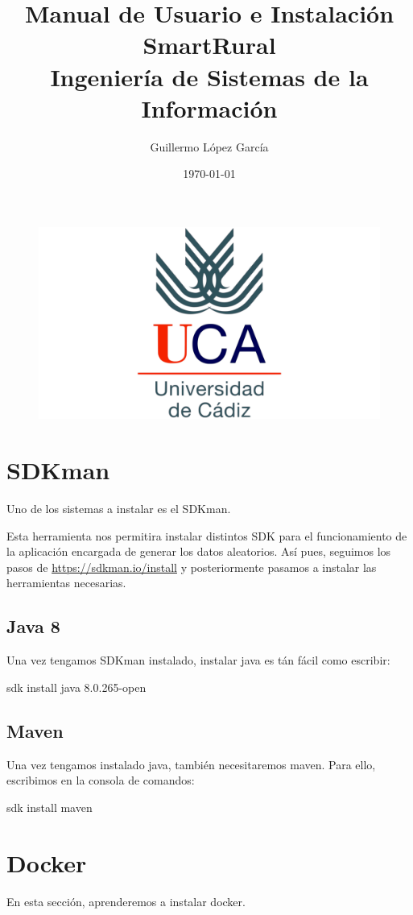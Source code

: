 \documentclass[a4paper,12pt]{article}
\title{\textbf{
  Manual de Usuario e Instalación\\SmartRural
} \\ \small Ingeniería de Sistemas de la Información}
\author{Guillermo López García}
\date{\today}
\begin{document}
\maketitle

\begin{figure}[ht]
    \centering
	\includegraphics[scale=0.1]{uca.png}
\end{figure}

\clearpage

\tableofcontents
\clearpage

\section{SDKman}
Uno de los sistemas a instalar es el SDKman.

Esta herramienta nos permitira instalar distintos SDK para el funcionamiento de la aplicación encargada de generar
los datos aleatorios. Así pues, seguimos los pasos de \url{https://sdkman.io/install} y posteriormente pasamos
a instalar las herramientas necesarias.

\subsection{Java 8}
Una vez tengamos SDKman instalado, instalar java es tán fácil como escribir: 

sdk install java 8.0.265-open

\subsection{Maven}
Una vez tengamos instalado java, también necesitaremos maven. Para ello, escribimos en la consola de comandos:

sdk install maven

\section{Docker}
En esta sección, aprenderemos a instalar docker.
\end{document}
